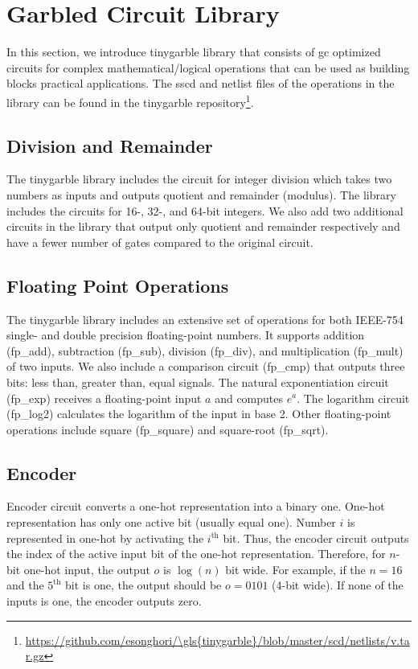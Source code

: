 \chapter{Garbled Circuit Library}\label{chap:library}
In this section, we introduce \gls{tinygarble} library that consists of \acrfull{gc} optimized circuits for complex mathematical/logical operations that can be used as building blocks practical applications.
The \acrfull{sscd} and \gls{netlist} files of the operations in the library can be found in the \gls{tinygarble} repository\footnote{\url{https://github.com/esonghori/\gls{tinygarble}/blob/master/scd/netlists/v.tar.gz}}.

\section{Division and Remainder}
The \gls{tinygarble} library includes the circuit for integer division which takes two numbers as inputs and outputs quotient and remainder (modulus).
The library includes the circuits for 16-, 32-, and 64-bit integers.
We also add two additional circuits in the library that output only quotient and remainder respectively and have a fewer number of gates compared to the original circuit.

\section{Floating Point Operations}
The \gls{tinygarble} library includes an extensive set of operations for both IEEE-754 single- and double precision floating-point numbers.
It supports addition (fp\_add), subtraction (fp\_sub), division (fp\_div), and multiplication (fp\_mult) of two inputs.
We also include a comparison circuit (fp\_cmp) that outputs three bits: less than, greater than, equal signals.
The natural exponentiation circuit (fp\_exp) receives a floating-point input $a$ and computes $e^a$.
The logarithm circuit (fp\_log2) calculates the logarithm of the input in base 2.
Other floating-point operations include square (fp\_square) and square-root (fp\_sqrt).

\section{Encoder}
Encoder circuit converts a one-hot representation into a binary one.
One-hot representation has only one active bit (usually equal one).
Number $i$ is represented in one-hot by activating the $i^{\text{th}}$ bit.
Thus, the encoder circuit outputs the index of the active input bit of the one-hot representation.
Therefore, for $n$-bit one-hot input, the output $o$ is $\log(n)$ bit wide.
For example, if the $n=16$ and the $5^{\text{th}}$ bit is one, the output should be $o=0101$ (4-bit wide).
If none of the inputs is one, the encoder outputs zero.


